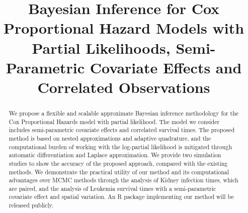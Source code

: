 \documentclass[ba]{imsart}
\begin{document}

\begin{frontmatter}
\title{Bayesian Inference for Cox Proportional Hazard Models with Partial Likelihoods, Semi-Parametric Covariate Effects and Correlated Observations}

\runtitle{}


\begin{abstract}
We propose a flexible and scalable approximate Bayesian inference methodology for the Cox Proportional Hazards model with partial likelihood. The model we consider includes semi-parametric covariate effects and correlated survival times. The proposed method is based on nested approximations and adaptive quadrature, and the computational burden of working with the log-partial likelihood is mitigated through automatic differentiation and Laplace approximation. We provide two simulation studies to show the accuracy of the proposed approach, compared with the existing methods.
We demonstrate the practical utility of our method and its computational advantages over MCMC methods through the analysis of Kidney infection times, which are paired, and the analysis of Leukemia survival times with a semi-parametric covariate effect and spatial variation. An R package implementing our method will be released publicly.

\end{abstract}

\begin{keyword}
\end{keyword}

\end{frontmatter}
\end{document}

